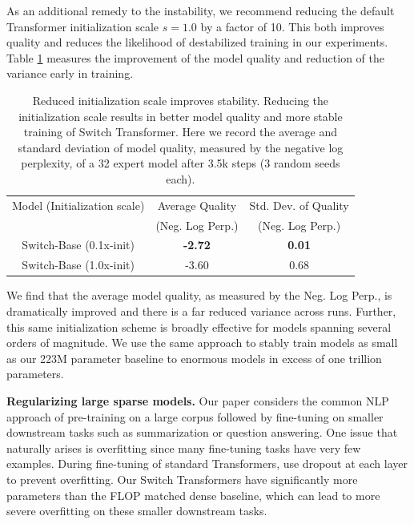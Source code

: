 \documentclass[twoside,11pt]{article}
\begin{document}
As an additional remedy to the instability, we recommend reducing the default Transformer initialization scale $s=1.0$ by a factor of 10.
This both improves quality and reduces the likelihood of destabilized training in our experiments.
Table \ref{tab: init} measures the improvement of the model quality and reduction of the variance early in training.
\begin{table}[!th]
\centering
    \begin{tabular}{ccc}
        \toprule
        Model (Initialization scale) & Average Quality & Std. Dev. of Quality \\ 
         & (Neg. Log Perp.) & (Neg. Log Perp.) \\ \hline
        Switch-Base (0.1x-init) & \textbf{-2.72} & \textbf{0.01} \\
        Switch-Base (1.0x-init) & -3.60 & 0.68 \\
        \bottomrule
    \end{tabular}
    \caption{Reduced initialization scale improves stability. Reducing the initialization scale results in better model quality and more stable training of Switch Transformer. Here we record the average and standard deviation of model quality, measured by the negative log perplexity, of a 32 expert model after 3.5k steps (3 random seeds each).}
    \label{tab: init}
\end{table}
We find that the average model quality, as measured by the Neg. Log Perp., is dramatically improved and there is a far reduced variance across runs.
Further, this same initialization scheme is broadly effective for models spanning several orders of magnitude.
We use the same approach to stably train models as small as our 223M parameter baseline to enormous models in excess of one trillion parameters.


\textbf{Regularizing large sparse models.} Our paper considers the common NLP approach of pre-training on a large corpus followed by fine-tuning on smaller downstream tasks such as summarization or question answering.
One issue that naturally arises is overfitting since many fine-tuning tasks have very few examples.
During fine-tuning of standard Transformers, \citet{raffel2019exploring} use dropout \citep{srivastava2014dropout} at each layer to prevent overfitting.
Our Switch Transformers have significantly more parameters than the FLOP matched dense baseline, which can lead to more severe overfitting on these smaller downstream tasks.
\end{document}
